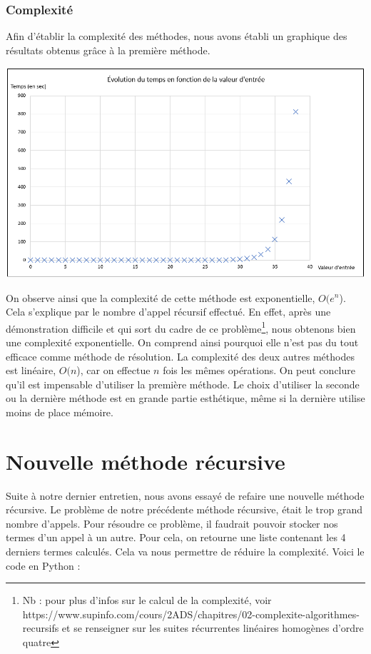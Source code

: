 \documentclass{article}
\newcommand{\code}[1]{}
\begin{document}
\section{Complexité}

Afin d'établir la complexité des méthodes, nous avons établi un graphique des résultats obtenus grâce à la première méthode.

\bigbreak
\begin{center}
\includegraphics[scale = 0.4]{Images/graphique.png}
\end{center}
\bigbreak

On observe ainsi que la complexité de cette méthode est exponentielle, $ O(e^n$). Cela s'explique par le nombre d'appel récursif effectué. En effet, après une démonstration difficile et qui sort du cadre de ce problème\footnote{Nb : pour plus d'infos sur le calcul de la complexité, voir https://www.supinfo.com/cours/2ADS/chapitres/02-complexite-algorithmes-recursifs et se renseigner sur les suites récurrentes linéaires homogènes d'ordre quatre}, nous obtenons bien une complexité exponentielle.
On comprend ainsi pourquoi elle n'est pas du tout efficace comme méthode de résolution.
\bigbreak
La complexité des deux autres méthodes est linéaire, $O(n$), car on effectue $n$ fois les mêmes opérations.
\bigbreak
On peut conclure qu'il est impensable d'utiliser la première méthode. Le choix d'utiliser la seconde ou la dernière méthode est en grande partie esthétique, même si la dernière utilise moins de place mémoire.
\bigbreak

\newpage
\part{Nouvelle méthode récursive}

Suite à notre dernier entretien, nous avons essayé de refaire une nouvelle méthode récursive. Le problème de notre précédente méthode récursive, était le trop grand nombre d'appels. Pour résoudre ce problème, il faudrait pouvoir stocker nos termes d'un appel à un autre. Pour cela, on retourne une liste contenant les 4 derniers termes calculés. Cela va nous permettre de réduire la complexité. Voici le code en Python :
\bigbreak
\code{Algos/Problem117_4.py}
\bigbreak
\end{document}
